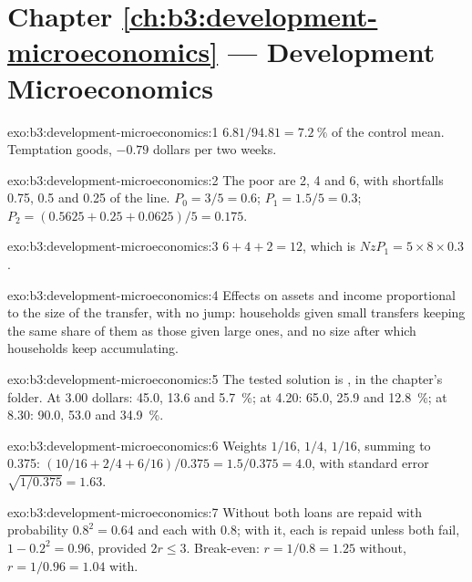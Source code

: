 \section*{Chapter \ref{ch:b3:development-microeconomics} --- Development Microeconomics}

\begin{solution}{exo:b3:development-microeconomics:1}
$6.81/94.81 = 7.2~\%$ of the control mean. Temptation goods, $-0.79$ dollars per two weeks. %
\end{solution}

\begin{solution}{exo:b3:development-microeconomics:2}
The poor are 2, 4 and 6, with shortfalls 0.75, 0.5 and 0.25 of the line. $P_0 = 3/5 = 0.6$; $P_1 = 1.5/5 = 0.3$; $P_2 = (0.5625 + 0.25 + 0.0625)/5 = 0.175$.
\end{solution}

\begin{solution}{exo:b3:development-microeconomics:3}
$6 + 4 + 2 = 12$, which is $N z P_1 = 5 \times 8 \times 0.3$.
\end{solution}

\begin{solution}{exo:b3:development-microeconomics:4}
Effects on assets and income proportional to the size of the transfer, with no
jump: households given small transfers keeping the same share of them as those given
large ones, and no size after which households keep accumulating.
\end{solution}

\begin{solution}{exo:b3:development-microeconomics:5}
The tested solution is , in the chapter's 
folder. At 3.00 dollars: 45.0, 13.6 and 5.7~\%; at 4.20: 65.0, 25.9 and 12.8~\%; at 8.30: 90.0, 53.0 and 34.9~\%. %
\end{solution}

\begin{solution}{exo:b3:development-microeconomics:6}
Weights $1/16$, $1/4$, $1/16$, summing to 0.375: $(10/16 + 2/4 + 6/16)/0.375 = 1.5/0.375 = 4.0$, with standard error $\sqrt{1/0.375} = 1.63$.
\end{solution}

\begin{solution}{exo:b3:development-microeconomics:7}
Without  both loans are repaid with probability $0.8^2 = 0.64$ and each with 0.8; with it, each
is repaid unless both fail, $1 - 0.2^2 = 0.96$, provided $2r \le 3$. Break-even: $r = 1/0.8 = 1.25$ without, $r = 1/0.96 = 1.04$ with.
\end{solution}

